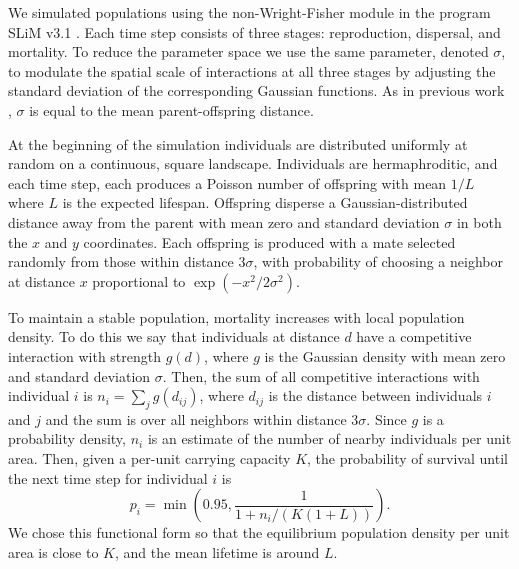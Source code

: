 \documentclass[10pt,twoside,lineno,hidelinks]{preprint}
\begin{document}
We simulated populations using the non-Wright-Fisher module in the program SLiM v3.1 \citep{Haller2019}. 
Each time step consists of three stages: reproduction, dispersal, and mortality. 
To reduce the parameter space we use the same parameter, denoted $\sigma$, 
to modulate the spatial scale of interactions at all three stages by adjusting the standard deviation of the corresponding Gaussian functions. 
As in previous work \citep{Wright1943,Ringbauer2017}, $\sigma$ is equal to the mean parent-offspring distance.  

At the beginning of the simulation individuals are distributed uniformly at random on a continuous, square landscape. 
Individuals are hermaphroditic, and each time step, each produces a Poisson number of offspring with mean $1/L$ where $L$ is the expected lifespan.
Offspring disperse a Gaussian-distributed distance away from the parent with mean zero and standard deviation $\sigma$
in both the $x$ and $y$ coordinates.
Each offspring is produced with a mate selected randomly from those within distance $3 \sigma$,
with probability of choosing a neighbor at distance $x$ proportional to $\exp(-x^2 / 2 \sigma^2)$.

To maintain a stable population, mortality increases with local population density.
To do this we say that individuals at distance $d$ have a competitive interaction with strength $g(d)$,
where $g$ is the Gaussian density with mean zero and standard deviation $\sigma$.
Then, the sum of all competitive interactions with individual $i$ is $n_i = \sum_j g(d_{ij})$,
where $d_{ij}$ is the distance between individuals $i$ and $j$ and the sum is over all neighbors within distance $3 \sigma$.
Since $g$ is a probability density, $n_i$ is an estimate of the number of nearby individuals per unit area.
Then, given a per-unit carrying capacity $K$, 
the probability of survival until the next time step for individual $i$ is
\begin{equation}
    p_i 
    =
    \min\left( 0.95, \frac{1}{1 + n_i / (K (1+L))} \right) .
\end{equation}
We chose this functional form so that the equilibrium population density per unit area is close to $K$, 
and the mean lifetime is around $L$.
\end{document}
